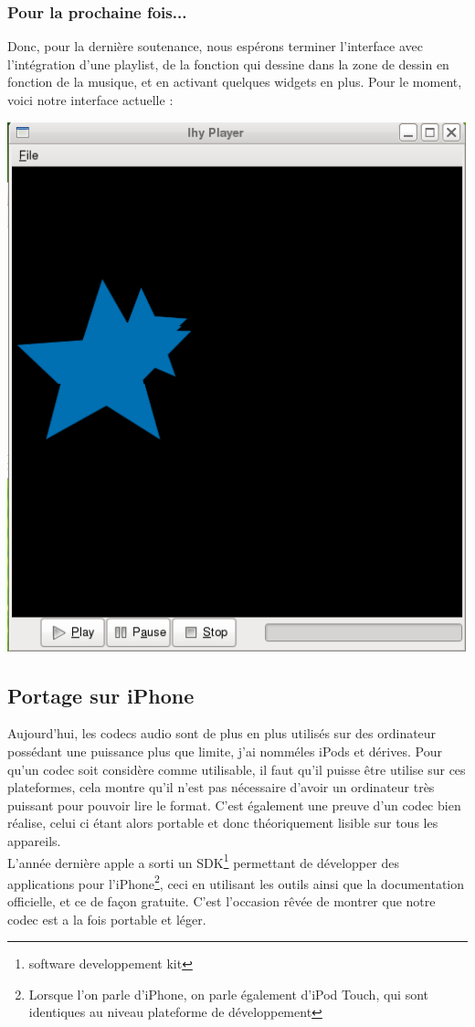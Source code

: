 \documentclass[a4paper,12pt]{article}
\begin{document}
	\subsubsection{Pour la prochaine fois...}
Donc, pour la derni\`ere soutenance, nous esp\'erons terminer l'interface avec
l'int\'egration d'une playlist, de la fonction qui dessine dans la zone de
dessin en fonction de la musique, et en activant quelques widgets en plus. Pour
le moment, voici notre interface actuelle :
\begin{center}
\includegraphics[scale=0.50]{img/Player.png}
\end{center}

\newpage

	\subsection{Portage sur iPhone}
Aujourd'hui, les codecs audio sont de plus en plus utilis\'es sur des
ordinateur poss\'edant une puissance plus que limite, j'ai nomm\'eles iPods
et d\'erives. Pour qu'un codec soit consid\`ere comme utilisable, il faut
qu'il puisse \^etre utilise sur ces plateformes, cela montre qu'il n'est
pas n\'ecessaire d'avoir un ordinateur tr\`es puissant pour pouvoir lire le
format. C'est \'egalement une preuve d'un codec bien r\'ealise, celui ci
\'etant alors portable et donc th\'eoriquement lisible sur tous les
appareils.\\
L'ann\'ee derni\`ere apple a sorti un SDK\footnote{software developpement
kit} permettant de d\'evelopper des applications pour l'iPhone\footnote{Lorsque
l'on parle d'iPhone, on parle \'egalement d'iPod Touch, qui sont identiques au
niveau plateforme de d\'eveloppement}, ceci en
utilisant les outils ainsi que la documentation officielle, et ce de façon gratuite.
C'est l'occasion r\^ev\'ee de montrer que notre codec est a la fois
portable et l\'eger.\\
\end{document}

